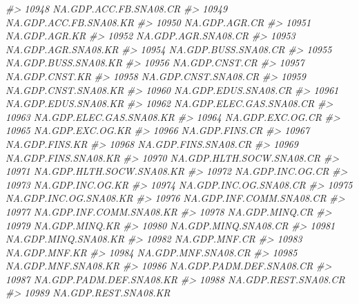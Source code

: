 \documentclass[
]{bxjsbook}
\newenvironment{Shaded}{\begin{snugshade}}{\end{snugshade}}
\newcommand{\CommentTok}[1]{\textcolor[rgb]{0.56,0.35,0.01}{\textit{#1}}}
\theoremstyle{definition}
\theoremstyle{definition}
\theoremstyle{definition}
\theoremstyle{definition}
\theoremstyle{remark}
\begin{document}
\begin{Shaded}
\begin{Highlighting}[]
\CommentTok{\#\textgreater{} 10948     NA.GDP.ACC.FB.SNA08.CR}
\CommentTok{\#\textgreater{} 10949     NA.GDP.ACC.FB.SNA08.KR}
\CommentTok{\#\textgreater{} 10950              NA.GDP.AGR.CR}
\CommentTok{\#\textgreater{} 10951              NA.GDP.AGR.KR}
\CommentTok{\#\textgreater{} 10952        NA.GDP.AGR.SNA08.CR}
\CommentTok{\#\textgreater{} 10953        NA.GDP.AGR.SNA08.KR}
\CommentTok{\#\textgreater{} 10954       NA.GDP.BUSS.SNA08.CR}
\CommentTok{\#\textgreater{} 10955       NA.GDP.BUSS.SNA08.KR}
\CommentTok{\#\textgreater{} 10956             NA.GDP.CNST.CR}
\CommentTok{\#\textgreater{} 10957             NA.GDP.CNST.KR}
\CommentTok{\#\textgreater{} 10958       NA.GDP.CNST.SNA08.CR}
\CommentTok{\#\textgreater{} 10959       NA.GDP.CNST.SNA08.KR}
\CommentTok{\#\textgreater{} 10960       NA.GDP.EDUS.SNA08.CR}
\CommentTok{\#\textgreater{} 10961       NA.GDP.EDUS.SNA08.KR}
\CommentTok{\#\textgreater{} 10962   NA.GDP.ELEC.GAS.SNA08.CR}
\CommentTok{\#\textgreater{} 10963   NA.GDP.ELEC.GAS.SNA08.KR}
\CommentTok{\#\textgreater{} 10964           NA.GDP.EXC.OG.CR}
\CommentTok{\#\textgreater{} 10965           NA.GDP.EXC.OG.KR}
\CommentTok{\#\textgreater{} 10966             NA.GDP.FINS.CR}
\CommentTok{\#\textgreater{} 10967             NA.GDP.FINS.KR}
\CommentTok{\#\textgreater{} 10968       NA.GDP.FINS.SNA08.CR}
\CommentTok{\#\textgreater{} 10969       NA.GDP.FINS.SNA08.KR}
\CommentTok{\#\textgreater{} 10970  NA.GDP.HLTH.SOCW.SNA08.CR}
\CommentTok{\#\textgreater{} 10971  NA.GDP.HLTH.SOCW.SNA08.KR}
\CommentTok{\#\textgreater{} 10972           NA.GDP.INC.OG.CR}
\CommentTok{\#\textgreater{} 10973           NA.GDP.INC.OG.KR}
\CommentTok{\#\textgreater{} 10974     NA.GDP.INC.OG.SNA08.CR}
\CommentTok{\#\textgreater{} 10975     NA.GDP.INC.OG.SNA08.KR}
\CommentTok{\#\textgreater{} 10976   NA.GDP.INF.COMM.SNA08.CR}
\CommentTok{\#\textgreater{} 10977   NA.GDP.INF.COMM.SNA08.KR}
\CommentTok{\#\textgreater{} 10978             NA.GDP.MINQ.CR}
\CommentTok{\#\textgreater{} 10979             NA.GDP.MINQ.KR}
\CommentTok{\#\textgreater{} 10980       NA.GDP.MINQ.SNA08.CR}
\CommentTok{\#\textgreater{} 10981       NA.GDP.MINQ.SNA08.KR}
\CommentTok{\#\textgreater{} 10982              NA.GDP.MNF.CR}
\CommentTok{\#\textgreater{} 10983              NA.GDP.MNF.KR}
\CommentTok{\#\textgreater{} 10984        NA.GDP.MNF.SNA08.CR}
\CommentTok{\#\textgreater{} 10985        NA.GDP.MNF.SNA08.KR}
\CommentTok{\#\textgreater{} 10986   NA.GDP.PADM.DEF.SNA08.CR}
\CommentTok{\#\textgreater{} 10987   NA.GDP.PADM.DEF.SNA08.KR}
\CommentTok{\#\textgreater{} 10988       NA.GDP.REST.SNA08.CR}
\CommentTok{\#\textgreater{} 10989       NA.GDP.REST.SNA08.KR}

\end{Highlighting}
\end{Shaded}
\end{document}
